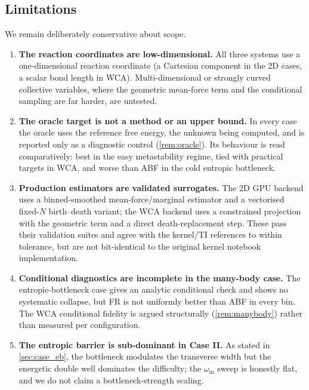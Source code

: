 \subsection{Limitations}
We remain deliberately conservative about scope.
\begin{enumerate}
  \item \textbf{The reaction coordinates are low-dimensional.} All three systems
        use a one-dimensional reaction coordinate (a Cartesian component in the
        2D cases, a scalar bond length in WCA). Multi-dimensional or strongly
        curved collective variables, where the geometric mean-force term and the
        conditional sampling are far harder, are untested.
  \item \textbf{The oracle target is not a method or an upper bound.} In every
        case the oracle uses the reference free energy, the unknown being
        computed, and is reported only as a diagnostic control (\cref{rem:oracle}).
        Its behaviour is read comparatively: best in the easy metastability
        regime, tied with practical targets in WCA, and worse than ABF in the cold
        entropic bottleneck.
  \item \textbf{Production estimators are validated surrogates.} The 2D GPU
        backend uses a binned-smoothed mean-force/marginal estimator and a
        vectorised fixed-$N$ birth--death variant; the WCA backend uses a
        constrained projection with the geometric term and a direct
        death-replacement step. These pass their validation suites and agree with
        the kernel/TI references to within tolerance, but are not bit-identical to
        the original kernel notebook implementation.
  \item \textbf{Conditional diagnostics are incomplete in the many-body case.}
        The entropic-bottleneck case gives an analytic conditional check and shows
        no systematic collapse, but FR is not uniformly better than ABF in every
        bin. The WCA conditional fidelity is argued structurally
        (\cref{rem:manybody}) rather than measured per configuration.
  \item \textbf{The entropic barrier is sub-dominant in Case II.} As stated in
        \cref{sec:case_eb}, the bottleneck modulates the transverse width but the
        energetic double well dominates the difficulty; the $\omega_{\mathrm{in}}$
        sweep is honestly flat, and we do not claim a bottleneck-strength scaling.
\end{enumerate}

